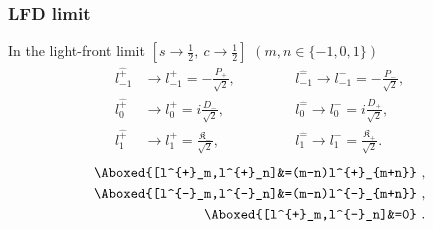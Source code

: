 \documentclass[]{article}
\numberwithin{equation}{section}
\begin{document}
{{\subsubsection{LFD limit}
In the light-front limit $[s\longrightarrow\frac{1}{2},~c\longrightarrow\frac{1}{2}]$ $(m,n\in\{-1,0,1\})$
\begin{align}
    l^{\hat{+}}_{-1}&\longrightarrow l^{+}_{-1}=-\frac{P_{+}}{\sqrt{2}},~~~~~~~~~~~~&&l^{\hat{-}}_{-1}\longrightarrow l^{-}_{-1}= -\frac{P_{-}}{\sqrt{2}},\\
    l^{\hat{+}}_{0}&\longrightarrow l^{+}_{0}=i\frac{D_{-}}{\sqrt{2}},~~~~~~~~~~~~&&l^{\hat{-}}_{0}\longrightarrow l^{-}_{0}= i\frac{D_{+}}{\sqrt{2}},\\
    l^{\hat{+}}_{1}&\longrightarrow l^{+}_{1}= \frac{\mathfrak{K}_{-}}{\sqrt{2}},~~~~~~~~~~~~&&l^{\hat{-}}_{1}\longrightarrow l^{-}_{1}= \frac{\mathfrak{K}_{+}}{\sqrt{2}}.
\end{align}
\begin{align}
    \Aboxed{[l^{+}_m,l^{+}_n]&=(m-n)l^{+}_{m+n}}~,\\
    \Aboxed{[l^{-}_m,l^{-}_n]&=(m-n)l^{-}_{m+n}}~,\\
    \Aboxed{[l^{+}_m,l^{-}_n]&=0}~.
\end{align}
\begin{table}[h!]
\centering
\caption{\label{tabelinterpolationlfd}$1+1$ conformal algebra in LFD}
\end{table}

}}
\end{document}
